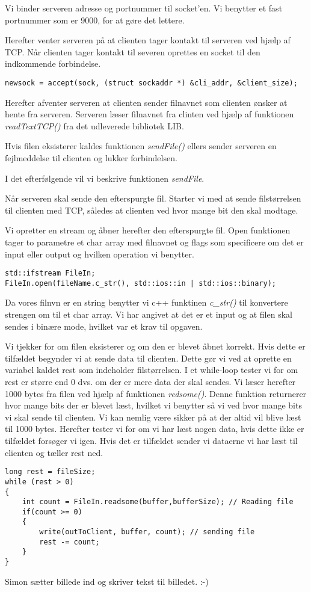 Vi binder serveren adresse og portnummer til socket'en. Vi benytter et fast portnummer som er 9000, for at gøre det lettere. 

Herefter venter serveren på at clienten tager kontakt til serveren ved hjælp af TCP. Når clienten tager kontakt til severen oprettes en socket til den indkommende forbindelse. 

\begin{lstlisting}
newsock = accept(sock, (struct sockaddr *) &cli_addr, &client_size);
\end{lstlisting}

Herefter afventer serveren at clienten sender filnavnet som clienten ønsker at hente fra serveren. Serveren læser filnavnet fra clinten ved hjælp af funktionen \textit{readTextTCP()} fra det udleverede bibliotek LIB. 

Hvis filen eksisterer kaldes funktionen \textit{sendFile()} ellers sender serveren en fejlmeddelse til clienten og lukker forbindelsen. 

I det efterfølgende vil vi beskrive funktionen \textit{sendFile}. 

Når serveren skal sende den efterspurgte fil. Starter vi med at sende filstørrelsen til clienten med TCP, således at clienten ved hvor mange bit den skal modtage. 

Vi opretter en stream og åbner herefter den efterspurgte fil. Open funktionen tager to parametre et char array med filnavnet og flags som specificere om det er input eller output og hvilken operation vi benytter. 

\begin{lstlisting}
std::ifstream FileIn; 
FileIn.open(fileName.c_str(), std::ios::in | std::ios::binary);
\end{lstlisting}

Da vores filnvn er en string benytter vi c++ funktinen \textit{c\_str()} til konvertere strengen om til et char array. Vi har angivet at det er et input og at filen skal sendes i binære mode, hvilket var et krav til opgaven. 

Vi tjekker for om filen eksisterer og om den er blevet åbnet korrekt.
Hvis dette er tilfældet begynder vi at sende data til clienten. Dette gør vi ved at oprette en variabel kaldet rest som indeholder filstørrelsen. 
I et while-loop tester vi for om rest er større end 0 dvs. om der er mere data der skal sendes. 
Vi læser herefter 1000 bytes fra filen ved hjælp af funktionen \textit{redsome()}. Denne funktion returnerer hvor mange bits der er blevet læst, hvilket vi benytter så vi ved hvor mange bits vi skal sende til clienten. Vi kan nemlig være sikker på at der altid vil blive læst til 1000 bytes. 
Herefter tester vi for om vi har læst nogen data, hvis dette ikke er tilfældet forsøger vi igen. Hvis det er tilfældet sender vi dataerne vi har læst til clienten og tæller rest ned. 

\begin{lstlisting}
long rest = fileSize;
while (rest > 0)
{
	int count = FileIn.readsome(buffer,bufferSize); // Reading file 
	if(count >= 0)
	{
		write(outToClient, buffer, count); // sending file
		rest -= count;
	}
}
\end{lstlisting}

Simon sætter billede ind og skriver tekst til billedet. :-)

